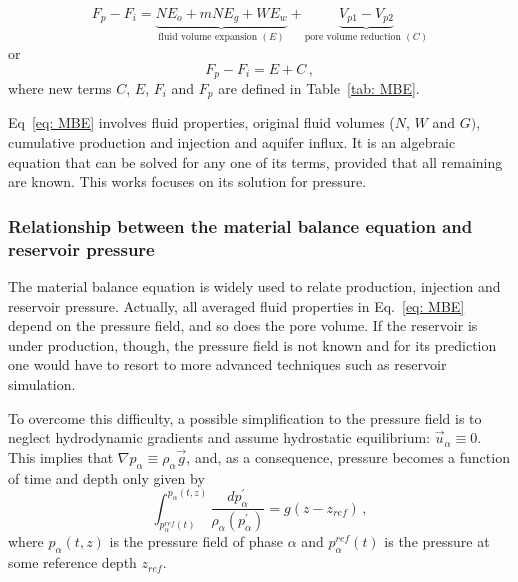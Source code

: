 \documentclass[authoryear,preprint,review,11pt]{elsarticle}
\begin{document}
\begin{equation}\label{eq: MBE}
F_p - F_i= \underbrace{N E_o + mN E_g + W E_w}_{\text{fluid volume expansion } (E)} +\underbrace{V_{p1}-V_{p2}}_{\text{pore volume reduction } (C)}
\end{equation}
or
\begin{equation}\label{eq: MBE_short}
F_p - F_i= E + C \, ,
\end{equation}
where new terms $C$, $E$, $F_i$ and $F_p$ are defined in Table~\ref{tab: MBE}. 

Eq~\eqref{eq: MBE} involves fluid properties, original fluid volumes ($N$, $W$ and $G)$, cumulative production and injection and aquifer influx.
It is an algebraic equation that can be solved for any one of its terms, provided that all remaining are known. This works focuses on its solution for pressure.

\subsubsection{Relationship between the material balance equation and reservoir pressure}


The material balance equation is widely used to relate production, injection and reservoir pressure. Actually, all averaged fluid properties in Eq.~\eqref{eq: MBE} depend on the pressure field, and so does the pore volume. If the reservoir is under production, though, the pressure field is not known and for its prediction one would have to resort to more advanced techniques such as reservoir simulation.


To overcome this difficulty, a possible simplification to the pressure field is to neglect hydrodynamic gradients and assume hydrostatic equilibrium: $\vec{u}_\alpha \equiv 0$. This implies that $\nabla p_\alpha \equiv \rho_\alpha \vec{g}$, and, as a consequence, pressure becomes a function of time and depth only given by
\begin{equation}\label{eq: p=rhogh}
\int_{p_\alpha^{ref} (t)}^{p_\alpha (t,z)} \frac{dp_\alpha^{'}}{\rho_\alpha \left(p_\alpha^{'}\right)} = g\left(z - z_{ref}\right) \, ,
\end{equation}
where $p_\alpha (t,z)$ is the pressure field of phase $\alpha$ and $p_\alpha^{ref} (t)$ is the pressure at some reference depth $z_{ref}$.
\end{document}
